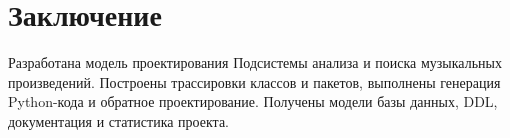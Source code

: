 \section{Заключение}
Разработана модель проектирования Подсистемы анализа и поиска музыкальных произведений. Построены трассировки классов
и пакетов, выполнены генерация Python-кода и обратное проектирование.
Получены модели базы данных, DDL, документация и статистика проекта.
